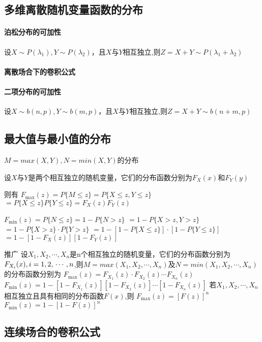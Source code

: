 \subsection{多维离散随机变量函数的分布}
\paragraph{泊松分布的可加性}
设$X \sim P({\lambda _1}),Y \sim P({\lambda _2})$，且$X$与$Y$相互独立,则$Z=X + Y \sim P({\lambda _1} + {\lambda _2})$

\paragraph{离散场合下的卷积公式}

\paragraph{二项分布的可加性}
设$X \sim b(n,p),Y \sim b(m,p)$，且$X$与$Y$相互独立,则$Z=X + Y \sim b(n + m,p)$

\subsection{最大值与最小值的分布}
$M=max(X,Y),N=min(X,Y)$的分布

设$X$与$Y$是两个相互独立的随机变量，它们的分布函数分别为$F_X(x)$和$F_Y(y)$

则有
${F_{\max }}(z) = P\{ M \leqslant z\}= P\{ X \leqslant z,Y \leqslant z\} $
$= P\{ X \leqslant z\} P\{ Y \leqslant z\}= {F_X}(z){F_Y}(z)$


${F_{\min }}(z) = P\{ N \leqslant z\} = 1 - P\{ N > z\}$
$= 1 - P\{ X > z,Y > z\}$
$= 1 - P\{ X > z\}  \cdot P\{ Y > z\}$
$ = 1 - [1 - P\{ X \leqslant z\} ] \cdot [1 - P\{ Y \leqslant z\} ]$
$= 1 - [1 - {F_X}(z)][1 - {F_Y}(z)]$

推广 设${X_1},{X_2}, \cdots ,{X_n}$是n个相互独立的随机变量，它们的分布函数分别为$F_{{X_i}}(x),i = 1,2,\\ \cdots ,n$,则$M =max(X_1,X_2,\cdots,X_n)$及$N =min(X_1,X_2,\cdots,X_n)$的分布函数分别为
${F_{\max }}(z) = {F_{{X_1}}}(z) \cdot {F_{{X_2}}}(z) \cdots {F_{{X_n}}}(z)$
${F_{\min }}(z) = 1 - [1 - {F_{{X_1}}}(z)][1 - {F_{{X_2}}}(z)] \cdots [1 - {F_{{X_n}}}(z)]$
若${X_1},{X_2}, \cdots ,{X_n}$相互独立且具有相同的分布函数$F(x)$,则
${F_{\max }}(z) = {[F(z)]^n}$${F_{\min }}(z) = 1 - {[1 - F(z)]^n}$

    \subsection{连续场合的卷积公式}

